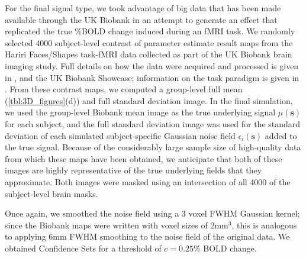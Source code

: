For the final signal type, we took advantage of big data that has been made available through the UK Biobank in an attempt to generate an effect that replicated the true \%BOLD change induced during an fMRI task. We randomly selected 4000 subject-level contrast of parameter estimate result maps from the Hariri Faces/Shapes task-fMRI data collected as part of the UK Biobank brain imaging study. Full details on how the data were acquired and processed is given in \textit{\citet{Miller2016-hd}}, \textit{\citet{Alfaro-Almagro2018-ip}} and the UK Biobank Showcase; information on the task paradigm is given in \textit{\citet{Hariri2002-ns}}. From these contrast maps, we computed a group-level full mean (\ref{tbl:3D_figures}(d)) and full standard deviation image. In the final simulation, we used the group-level Biobank mean image as the true underlying signal $\mu(\bm{s})$ for each subject, and the full standard deviation image was used for the standard deviation of each simulated subject-specific Gaussian noise field $\epsilon_{i}(\bm{s})$ added to the true signal. Because of the considerably large sample size of high-quality data from which these maps have been obtained, we anticipate that both of these images are highly representative of the true underlying fields that they approximate. Both images were masked using an intersection of all 4000 of the subject-level brain masks. 

Once again, we smoothed the noise field using a 3 voxel FWHM Gaussian kernel; since the Biobank maps were written with voxel sizes of 2mm$^{3}$, this is analogous to applying 6mm FWHM smoothing to the noise field of the original data. We obtained Confidence Sets for a threshold of $c = 0.25\%$ BOLD change. 

